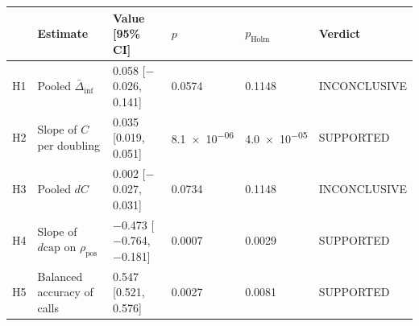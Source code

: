\begin{tabular}{@{}l l l l l l@{}}
\toprule
& Estimate & Value [95\% CI] & $p$ & $p_{\mathrm{Holm}}$ & Verdict \\
\midrule
H1 & Pooled $\bar\Delta_{\mathrm{inf}}$ & 0.058 [$-$0.026, 0.141] & 0.0574 & 0.1148 & INCONCLUSIVE \\
H2 & Slope of $C$ per doubling & 0.035 [0.019, 0.051] & \num{8.1e-06} & \num{4.0e-05} & SUPPORTED \\
H3 & Pooled $dC$ & 0.002 [$-$0.027, 0.031] & 0.0734 & 0.1148 & INCONCLUSIVE \\
H4 & Slope of $d\mathrm{cap}$ on $\rho_{\mathrm{pos}}$ & $-$0.473 [$-$0.764, $-$0.181] & 0.0007 & 0.0029 & SUPPORTED \\
H5 & Balanced accuracy of calls & 0.547 [0.521, 0.576] & 0.0027 & 0.0081 & SUPPORTED \\
\bottomrule
\end{tabular}
